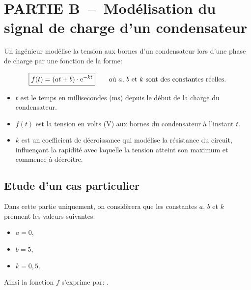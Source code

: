 \medskip

\section*{PARTIE B~--~Modélisation du signal de charge d'un condensateur}

Un ingénieur modélise la tension aux bornes d'un condensateur lors d'une phase de charge par une fonction de la forme:

\[\boxed{f(t)=(at+b)\cdot \mathrm{e}^{-kt}}\qquad \text{où $a$, $b$ et $k$ sont des constantes réelles.}\]

\begin{itemize}
    \item $t$ est le temps en millisecondes (ms) depuis le début de la charge du condensateur.
    \item $f(t)$ est la tension en volts (V) aux bornes du condensateur à l'instant $t$.
    \item $k$ est un coefficient de décroissance qui modélise la résistance du circuit, influençant la rapidité avec laquelle la tension atteint son maximum et commence à décroître.
\end{itemize}

\subsection*{Etude d'un cas particulier}

    Dans cette partie uniquement, on considèrera que les constantes $a$, $b$ et $k$ prennent les valeurs suivantes:

    \begin{minipage}{0.28\textwidth}
\begin{itemize}
    \item $a=0$,
    \item $b=5$,
    \item $k=0,5$.
\end{itemize}
\end{minipage}\hfill{}
\begin{minipage}{0.68\textwidth}
    Ainsi la fonction $f$ s'exprime par: .

\end{minipage}



